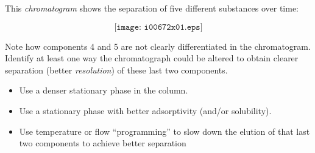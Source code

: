 

This {\it chromatogram} shows the separation of five different substances over time:

$$\texttt{[image: i00672x01.eps]}$$

Note how components 4 and 5 are not clearly differentiated in the chromatogram.  Identify at least one way the chromatograph could be altered to obtain clearer separation (better {\it resolution}) of these last two components.







\begin{itemize}
\item{} Use a denser stationary phase in the column.
\item{} Use a stationary phase with better adsorptivity (and/or solubility).
\item{} Use temperature or flow ``programming'' to slow down the elution of that last two components to achieve better separation
\end{itemize}











